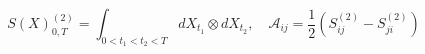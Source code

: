 \begin{theorem}
\begin{equation}
  S(X)_{0,T}^{(2)} = \int_{0 < t_1 < t_2 < T} dX_{t_1} \otimes dX_{t_2}, \quad \mathcal{A}_{ij} = \frac{1}{2}\left(S^{(2)}_{ij} - S^{(2)}_{ji}\right)
\end{equation}
\end{theorem}
